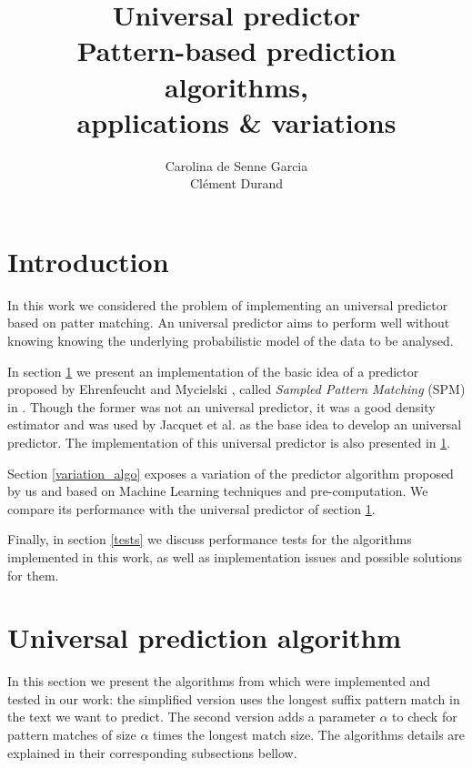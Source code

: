 \documentclass[a4paper,12pt]{article}
\title{%
  Universal predictor\\\small%
  Pattern-based prediction algorithms,\\%
  applications \& variations%
}
\author{%
  Carolina de Senne Garcia\\%
  Clément Durand%
}
\begin{document}
\maketitle

\vspace*{\fill}

\begin{abstract}
  \lipsum[1-2]
\end{abstract}

\vspace*{\fill}

\clearpage

\tableofcontents

\clearpage

\section*{Introduction}

In this work we considered the problem of implementing an universal predictor based on patter matching. An universal predictor aims to perform well without knowing knowing the underlying probabilistic model of the data to be analysed.

In section \ref{paper_algos} we present an implementation of the basic idea of a predictor proposed by Ehrenfeucht and Mycielski \cite{basic_algo}, called \textit{Sampled Pattern Matching} (SPM) in \cite{paper}. Though the former was not an universal predictor, it was a good density estimator and was used by Jacquet et al. \cite{paper} as the base idea to develop an universal predictor. The implementation of this universal predictor is also presented in \ref{paper_algos}.

Section \ref{variation_algo} exposes a variation of the predictor algorithm proposed by us and based on Machine Learning techniques and pre-computation. We compare its performance with the universal predictor of section \ref{paper_algos}.

Finally, in section \ref{tests} we discuss performance tests for the algorithms implemented in this work, as well as implementation issues and possible solutions for them.

\section{Universal prediction algorithm}\label{paper_algos}

  In this section we present the algorithms from \cite{paper} which were implemented and tested in our work: the simplified version uses the longest suffix pattern match in the text we want to predict. The second version adds a parameter $\alpha$ to check for pattern matches of size $\alpha$ times the longest match size. The algorithms details are explained in their corresponding subsections bellow.
\end{document}
